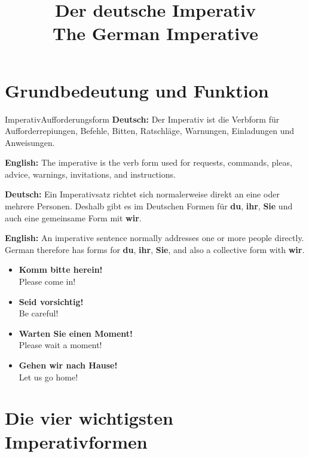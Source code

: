 \documentclass[a4paper,11pt]{article}
\title{Der deutsche Imperativ\\\large The German Imperative}
\date{}
\newcommand{\GermanText}[1]{\textbf{Deutsch: }#1\par}
\newcommand{\EnglishText}[1]{{\small\color{SoftGray}\textbf{English: }#1\par}}
\newcommand{\ExampleItem}[2]{\item \textbf{#1}\\{\small\color{SoftGray}#2}}
\begin{document}
    \maketitle
    \tableofcontents
    \newpage

    \section{Grundbedeutung und Funktion}

        \begin{grammarentry}{Imperativ}{Aufforderungsform}
            \GermanText{Der Imperativ ist die Verbform für Aufforderrepiungen, Befehle, Bitten, Ratschläge, Warnungen, Einladungen und Anweisungen.}
            \EnglishText{The imperative is the verb form used for requests, commands, pleas, advice, warnings, invitations, and instructions.}

            \GermanText{Ein Imperativsatz richtet sich normalerweise direkt an eine oder mehrere Personen. Deshalb gibt es im Deutschen Formen für \textbf{du}, \textbf{ihr}, \textbf{Sie} und auch eine gemeinsame Form mit \textbf{wir}.}
            \EnglishText{An imperative sentence normally addresses one or more people directly. German therefore has forms for \textbf{du}, \textbf{ihr}, \textbf{Sie}, and also a collective form with \textbf{wir}.}
        \end{grammarentry}

        \begin{exbox}
            \begin{itemize}
                \ExampleItem{Komm bitte herein!}{Please come in!}
                \ExampleItem{Seid vorsichtig!}{Be careful!}
                \ExampleItem{Warten Sie einen Moment!}{Please wait a moment!}
                \ExampleItem{Gehen wir nach Hause!}{Let us go home!}
            \end{itemize}
        \end{exbox}

    \section{Die vier wichtigsten Imperativformen}
\end{document}
